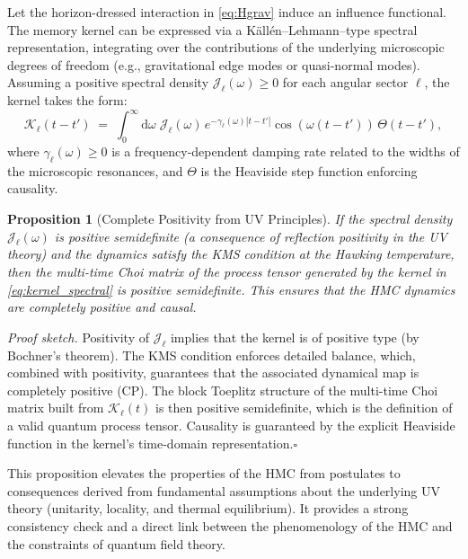 \documentclass[a4paper,11pt]{article}
\newcommand{\eg}{e.g.\xspace}
\newcommand{\HMC}{\textup{\textsc{HMC}}\xspace}
\theoremstyle{plain}
\newtheorem{proposition}{Proposition}
\theoremstyle{definition}
\theoremstyle{remark}
\begin{document}
Let the horizon-dressed interaction in \eqref{eq:Hgrav} induce an influence functional. The memory kernel can be expressed via a K\"all\'en--Lehmann--type spectral representation, integrating over the contributions of the underlying microscopic degrees of freedom (\eg, gravitational edge modes or quasi-normal modes). Assuming a positive spectral density $\mathcal{J}_\ell(\omega)\ge 0$ for each angular sector $\ell$, the kernel takes the form:
\begin{equation}
\mathcal{K}_\ell(t-t')\;=\;\int_0^\infty\! \mathrm{d}\omega\; \mathcal{J}_\ell(\omega)\, e^{-\gamma_\ell(\omega) |t-t'|}\cos(\omega (t-t'))\,\Theta(t-t'),
\label{eq:kernel_spectral}
\end{equation}
where $\gamma_\ell(\omega)\ge 0$ is a frequency-dependent damping rate related to the widths of the microscopic resonances, and $\Theta$ is the Heaviside step function enforcing causality.

\begin{proposition}[Complete Positivity from UV Principles]
\label{prop:uv-kernel}
If the spectral density $\mathcal{J}_\ell(\omega)$ is positive semidefinite (a consequence of reflection positivity in the UV theory) and the dynamics satisfy the KMS condition at the Hawking temperature, then the multi-time Choi matrix of the process tensor generated by the kernel in \eqref{eq:kernel_spectral} is positive semidefinite. This ensures that the \HMC{} dynamics are completely positive and causal.
\end{proposition}

\textit{Proof sketch.} Positivity of $\mathcal{J}_\ell$ implies that the kernel is of positive type (by Bochner's theorem). The KMS condition enforces detailed balance, which, combined with positivity, guarantees that the associated dynamical map is completely positive (CP). The block Toeplitz structure of the multi-time Choi matrix built from $\mathcal{K}_\ell(t)$ is then positive semidefinite, which is the definition of a valid quantum process tensor. Causality is guaranteed by the explicit Heaviside function in the kernel's time-domain representation.\hfill$\square$

This proposition elevates the properties of the \HMC{} from postulates to consequences derived from fundamental assumptions about the underlying UV theory (unitarity, locality, and thermal equilibrium). It provides a strong consistency check and a direct link between the phenomenology of the \HMC{} and the constraints of quantum field theory.
\end{document}
